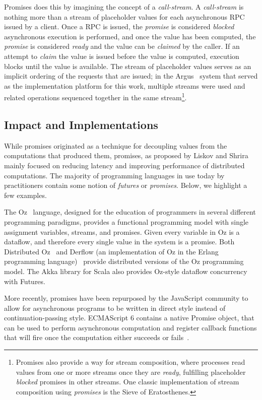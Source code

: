 Promises does this by imagining the concept of a \textit{call-stream}.  A \textit{call-stream} is nothing more than a stream of placeholder values for each asynchronous RPC issued by a client.  Once a RPC is issued, the \textit{promise} is considered \textit{blocked} asynchronous execution is performed, and once the value has been computed, the \textit{promise} is considered \textit{ready} and the value can be \textit{claimed} by the caller.  If an attempt to \textit{claim} the value is issued before the value is computed, execution blocks until the value is available.  The stream of placeholder values serves as an implicit ordering of the requests that are issued; in the Argus~\cite{liskov1988distributed} system that served as the implementation platform for this work, multiple streams were used and related operations sequenced together in the same stream\footnote{Promises also provide a way for stream composition, where processes read values from one or more streams once they are \textit{ready}, fulfilling placeholder \textit{blocked} promises in other streams.  One classic implementation of stream composition using \textit{promises} is the Sieve of Eratosthenes.}.

\subsection{Impact and Implementations}

While promises originated as a technique for decoupling values from the computations that produced them, promises, as proposed by Liskov and Shrira mainly focused on reducing latency and improving performance of distributed computations.  The majority of programming languages in use today by practitioners contain some notion of \textit{futures} or \textit{promises}.  Below, we highlight a few examples.

The Oz~\cite{henz1993oz} language, designed for the education of programmers in several different programming paradigms, provides a functional programming model with single assignment variables, streams, and promises.  Given every variable in Oz is a dataflow, and therefore every single value in the system is a promise.  Both Distributed Oz~\cite{haridi1997overview} and Derflow (an implementation of Oz in the Erlang programming language)~\cite{Bravo:2014:DDD:2633448.2633451} provide distributed versions of the Oz programming model.  The Akka library for Scala also provides Oz-style dataflow concurrency with Futures.

More recently, promises have been repurposed by the JavaScript community to allow for asynchronous programs to be written in direct style instead of continuation-passing style.  ECMAScript 6 contains a native Promise object, that can be used to perform asynchronous computation and register callback functions that will fire once the computation either succeeds or fails~\cite{wiki:futures}. 

